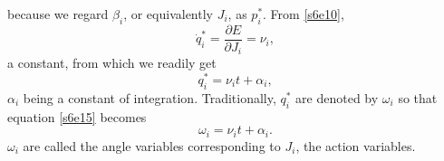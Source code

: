 \documentclass{article}
\newcommand{\pd}[2]{\frac{\partial{#1}}{\partial{#2}}}
\numberwithin{equation}{section}
\theoremstyle{plain}
\numberwithin{thm}{section}
\theoremstyle{plain}
\numberwithin{prop}{section}
\theoremstyle{definition}
\numberwithin{defn}{section}
\theoremstyle{remark}
\begin{document}
because we regard $\beta_i$, or equivalently $J_i$, as $p_i^\ast$. From
\eqref{s6e10},
\begin{equation}\label{s6e13}
\dot{q}_i^\ast = \pd{E}{J_i} = \nu_i,
\end{equation}
a constant, from which we readily get
\begin{equation}\label{s6e14}
q_i^\ast = \nu_i t + \alpha_i,
\end{equation}
$\alpha_i$ being a constant of integration. Traditionally, $q_i^\ast$ are
denoted by $\omega_i$ so that equation \eqref{s6e15} becomes
\begin{equation}\label{s6e15}
\omega_i = \nu_i t + \alpha_i.
\end{equation}
$\omega_i$ are called the angle variables corresponding to $J_i$, the action
variables.



\end{document}

